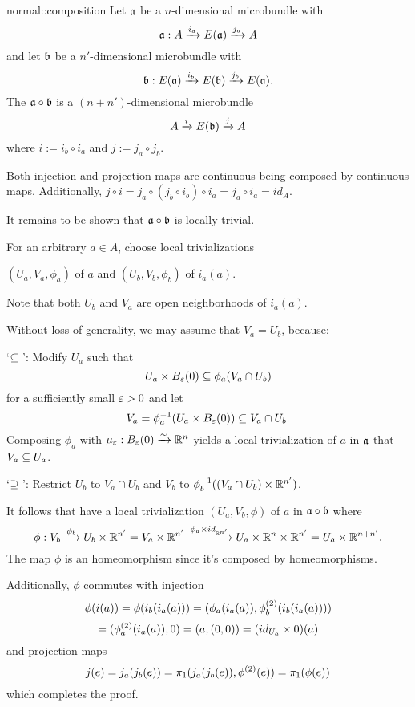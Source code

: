 \begin{mydefinition}{normal::composition}{}
    Let $\ba$ be a $n$-dimensional microbundle with
    \[ \bundledef{\ba}{A}{E(\ba)}{i_a}{j_a} \]
    and let $\bb$ be a $n'$-dimensional microbundle with
    \[ \bundledef{\bb}{E(\ba)}{E(\bb)}{i_b}{j_b}. \]
    The  $\ba \circ \bb$ is a $(n + n')$-dimensional microbundle
    \[ \bundle{A}{E(\bb)}{i}{j} \]
    where $i := i_b \circ i_a$ and $j := j_a \circ j_b$.
\end{mydefinition}

\begin{myproof}
    Both injection and projection maps are continuous being composed by continuous maps.
    Additionally, $j \circ i = j_a \circ (j_b \circ i_b) \circ i_a = j_a \circ i_a = id_A$.

    It remains to be shown that $\ba \circ \bb$ is locally trivial.

    For an arbitrary $a \in A$, choose local trivializations
    \begin{center}
        $(U_a, V_a, \phi_a)$ of $a$ and $(U_b, V_b, \phi_b)$ of $i_a(a)$.
    \end{center}
    Note that both $U_b$ and $V_a$ are open neighborhoods of $i_a(a)$.
    
    Without loss of generality, we may assume that $V_a = U_b$, because:
    
    `$\sub$':
    Modify $U_a$ such that
    \[ U_a \times \ball[\eps] \sub \phi_a(V_a \cap U_b) \]
    for a sufficiently small $\eps > 0$ and let
    \[ V_a = \inv{\phi_a}(U_a \times \ball[\eps]) \sub V_a \cap U_b. \]
    Composing $\phi_a$ with $\mu_\eps: \ball[\eps] \isomto \R^n$
    yields a local trivialization of $a$ in $\ba$ that $V_a \sub U_a$.

    `$\bus$': Restrict $U_b$ to $V_a \cap U_b$ and $V_b$ to $\inv{\phi_b}((V_a \cap U_b) \times \R^{n'})$.

    It follows that have a local trivialization
    $(U_a, V_b, \phi)$ of $a$ in $\ba \circ \bb$ where
    \[ 
        \phi: V_b \xto{\phi_b} U_b \times \R^{n'}
        = V_a \times \R^{n'}
        \xto{\phi_a \times id_{\R^{n'}}} U_a \times \R^{n} \times \R^{n'}
        = U_a \times \R^{n + n'}.
    \]
    The map $\phi$ is an homeomorphism since it's composed by homeomorphisms.

    Additionally, $\phi$ commutes with injection
    \[ \phi(i(a)) = \phi(i_b(i_a(a))) = (\phi_a(i_a(a)), \snd{\phi_b}(i_b(i_a(a)))) \]
    \[ = (\snd{\phi_a}(i_a(a)), 0) = (a, (0, 0)) = (id_{U_a} \times 0)(a) \]
    and projection maps
    \[ j(e) = j_a(j_b(e)) = \pi_1(j_a(j_b(e)), \snd{\phi}(e)) = \pi_1(\phi(e)) \]
    which completes the proof.
\end{myproof}
